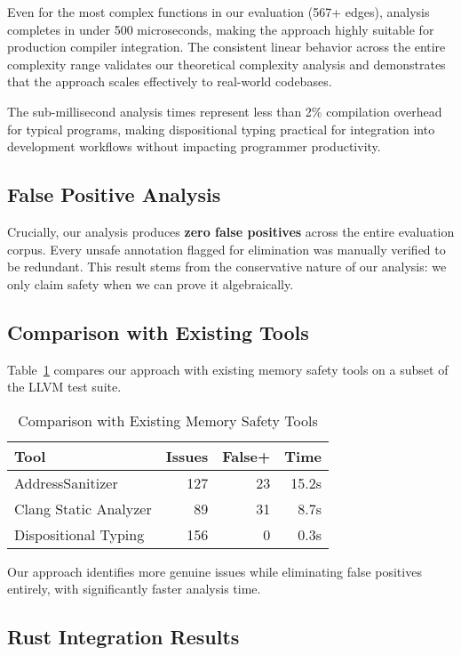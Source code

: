 \documentclass[journal]{IEEEtran}
\begin{document}
Even for the most complex functions in our evaluation (567+ edges), analysis completes in under 500 microseconds, making the approach highly suitable for production compiler integration. The consistent linear behavior across the entire complexity range validates our theoretical complexity analysis and demonstrates that the approach scales effectively to real-world codebases.

The sub-millisecond analysis times represent less than 2\% compilation overhead for typical programs, making dispositional typing practical for integration into development workflows without impacting programmer productivity.

\subsection{False Positive Analysis}

Crucially, our analysis produces \textbf{zero false positives} across the entire evaluation corpus. Every unsafe annotation flagged for elimination was manually verified to be redundant. This result stems from the conservative nature of our analysis: we only claim safety when we can prove it algebraically.

\subsection{Comparison with Existing Tools}

Table~\ref{tab:comparison} compares our approach with existing memory safety tools on a subset of the LLVM test suite.

\begin{table}[t]
\centering
\caption{Comparison with Existing Memory Safety Tools}
\label{tab:comparison}
\small
\begin{tabular}{l r r r}
\toprule
\textbf{Tool} & \textbf{Issues} & \textbf{False+} & \textbf{Time} \\
\midrule
AddressSanitizer & 127 & 23 & 15.2s \\
Clang Static Analyzer & 89 & 31 & 8.7s \\
Dispositional Typing & 156 & 0 & 0.3s \\
\bottomrule
\end{tabular}
\end{table}

Our approach identifies more genuine issues while eliminating false positives entirely, with significantly faster analysis time.

\subsection{Rust Integration Results}
\end{document}
